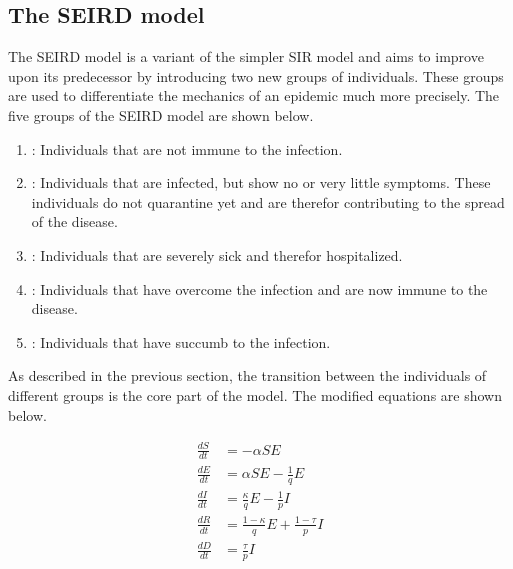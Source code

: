 \subsection{The SEIRD model}
\label{sec:SEIRD}
The SEIRD model is a variant of the simpler SIR model%
and aims to improve upon its predecessor by
introducing two new groups of individuals. These groups are used to differentiate the mechanics of an epidemic much
more precisely.
The five groups of the SEIRD model are shown below.

\begin{enumerate}[label=$\bullet$]
	\item {}: Individuals that are not immune to the infection.
	\item {}: Individuals that are infected, but show no or very little symptoms. These individuals
		do not quarantine yet and are therefor contributing to the spread of the disease.
	\item {}: Individuals that are severely sick and therefor hospitalized.
	\item {}: Individuals that  have overcome the infection and are now immune to the disease.
	\item {}: Individuals that have succumb to the infection.
\end{enumerate}


As described in the previous section, the transition between the individuals of different groups is the core
part of the model. The modified equations are shown below.

\begin{align}
	\frac{dS}{dt} &= -\alpha S E \label{eq:SEIRD1_S} \\
	\frac{dE}{dt} &= \alpha S E -\frac{1}{q} E \label{eq:SEIRD1_E} \\
	\frac{dI}{dt} &= \frac{\kappa}{q} E - \frac{1}{p} I \label{eq:SEIRD1_I} \\
	\frac{dR}{dt} &= \frac{1-\kappa}{q} E + \frac{1-\tau}{p} I \label{eq:SEIRD1_R} \\
	\frac{dD}{dt} &= \frac{\tau}{p} I \label{eq:SEIRD1_D} 
\end{align}

